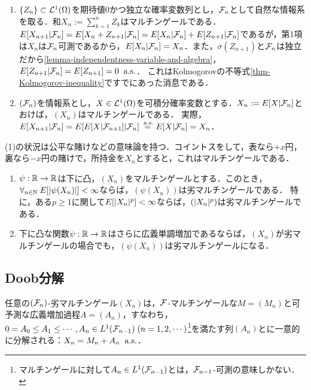 \documentclass[uplatex,dvipdfmx]{jsreport}
\begin{document}
\begin{example}\mbox{}
    \begin{enumerate}
        \item $\{Z_n\}\subset\mathcal{L}^1(\Omega)$を期待値$0$かつ独立な確率変数列とし，$\mathcal{F}_n$として自然な情報系を取る．和$X_n:=\sum^n_{k=1}Z_k$はマルチンゲールである．
        $E[X_{n+1}|\mathcal{F}_n]=E[X_n+Z_{n+1}|\mathcal{F}_n]=E[X_n|\mathcal{F}_n]+E[Z_{n+1}|\mathcal{F}_n]$であるが，第1項は$X_n$は$\mathcal{F}_n$可測であるから，$E[X_n|\mathcal{F}_n]=X_n$．また，$\sigma(Z_{n+1})$と$\mathcal{F}_n$は独立だから\ref{lemma-independentness-variable-and-algebra}，$E[Z_{n+1}|\mathcal{F}_n]=E[Z_{n+1}]=0\;\;\mathrm{a.s.}$．
        これはKolmogorovの不等式\ref{thm-Kolmogorov-inequality}ですでにあった消息である．
        \item $(\mathcal{F}_n)$を情報系とし，$X\in\mathcal{L}^1(\Omega)$を可積分確率変数とする．$X_n:=E[X|\mathcal{F}_n]$とおけば，$(X_n)$はマルチンゲールである．
        実際，$E[X_{n+1}|\mathcal{F}_n]=E[E[X|\mathcal{F}_{n+1}]|\mathcal{F}_n]\overset{\;\mathrm{a.s.}}{=}E[X|\mathcal{F}_n]=X_n$．
    \end{enumerate}
    (1)の状況は公平な賭けなどの意味論を持つ．コイントスをして，表なら$+x$円，裏なら$-x$円の賭けで，所持金を$X_n$とすると，これはマルチンゲールである．
\end{example}

\begin{lemma}[劣マルチンゲール性の保存]\mbox{}
    \begin{enumerate}
        \item $\psi:\mathbb{R}\to\mathbb{R}$は下に凸，$(X_n)$をマルチンゲールとする．このとき，$\forall_{n\in\mathbb{N}}\;E[\lvert\psi(X_n)\rvert]<\infty$ならば，$(\psi(X_n))$は劣マルチンゲールである．
        特に，ある$p\ge1$に関して$E[\lvert X_n\rvert^p]<\infty$ならば，$(\lvert X_n\rvert^p)$は劣マルチンゲールである．
        \item 下に凸な関数$\psi:\mathbb{R}\to\mathbb{R}$はさらに広義単調増加であるならば，$(X_n)$が劣マルチンゲールの場合でも，$(\psi(X_n))$は劣マルチンゲールになる．
    \end{enumerate}
\end{lemma}

\subsection{Doob分解}

\begin{theorem}
    任意の$(\mathcal{F}_n)$-劣マルチンゲール$(X_n)$は，$\mathcal{F}$-マルチンゲールな$M=(M_n)$と可予測な広義増加過程$A=(A_n)$，すなわち，$0=A_0\le A_1\le\cdots,A_n\in L^1(\mathcal{F}_{n-1})\;(n=1,2,\cdots)$\footnote{マルチンゲールに対して$A_n\in L^1(\mathcal{F}_{n-1})$とは，$\mathcal{F}_{n-1}$-可測の意味しかない．}を満たす列$(A_n)$とに一意的に分解される：$X_n=M_n+A_n\;\;\mathrm{a.s.}$．
\end{theorem}
\end{document}
